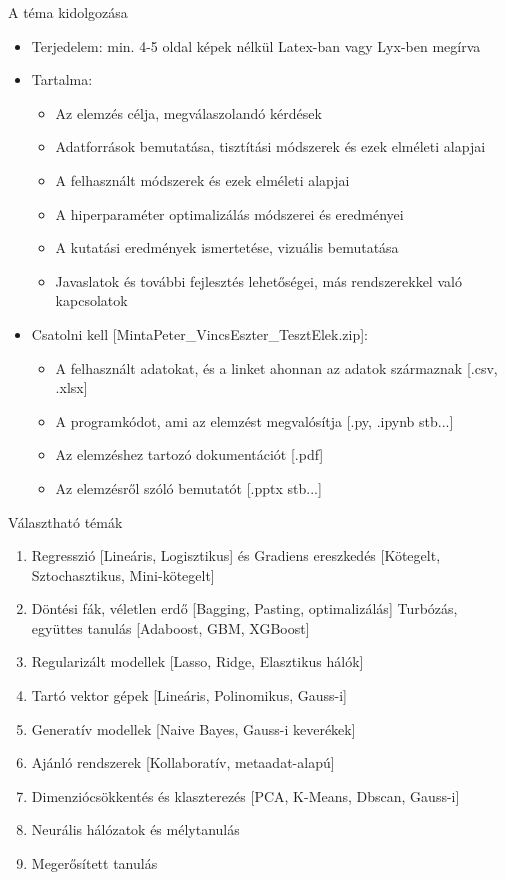 \documentclass[english, aspectratio=169]{beamer}
\begin{document}
\begin{frame}{A téma kidolgozása}
\begin{itemize}
	\item Terjedelem: min. 4-5 oldal képek nélkül Latex-ban vagy Lyx-ben megírva\par\smallskip
	\item Tartalma:
	\begin{itemize}
		\item Az elemzés célja, megválaszolandó kérdések
		\item Adatforrások bemutatása, tisztítási módszerek és ezek elméleti alapjai
		\item A felhasznált módszerek és ezek elméleti alapjai
		\item A hiperparaméter optimalizálás módszerei és eredményei
		\item A kutatási eredmények ismertetése, vizuális bemutatása
		\item Javaslatok és további fejlesztés lehetőségei, más rendszerekkel való kapcsolatok
	\end{itemize}\par\smallskip
	\item Csatolni kell [MintaPeter\_VincsEszter\_TesztElek.zip]:
	\begin{itemize}
		\item A felhasznált adatokat, és a linket ahonnan az adatok származnak [.csv, .xlsx]
		\item A programkódot, ami az elemzést megvalósítja [.py, .ipynb stb...]
		\item Az elemzéshez tartozó dokumentációt [.pdf]
		\item Az elemzésről szóló bemutatót [.pptx stb...]
	\end{itemize}
\end{itemize}
\end{frame}

\begin{frame}{Választható témák}
\begin{enumerate}
	\item Regresszió [Lineáris, Logisztikus] és Gradiens ereszkedés [Kötegelt, Sztochasztikus, Mini-kötegelt]
	\item Döntési fák, véletlen erdő [Bagging, Pasting, optimalizálás] Turbózás, együttes tanulás [Adaboost, GBM, XGBoost]
	\item Regularizált modellek [Lasso, Ridge, Elasztikus hálók]
	\item Tartó vektor gépek [Lineáris, Polinomikus, Gauss-i]
	\item Generatív modellek [Naive Bayes, Gauss-i keverékek]
	\item Ajánló rendszerek [Kollaboratív, metaadat-alapú]
	\item Dimenziócsökkentés és klaszterezés [PCA, K-Means, Dbscan, Gauss-i]
	\item Neurális hálózatok és mélytanulás
	\item Megerősített tanulás
\end{enumerate}
\end{frame}
\end{document}
